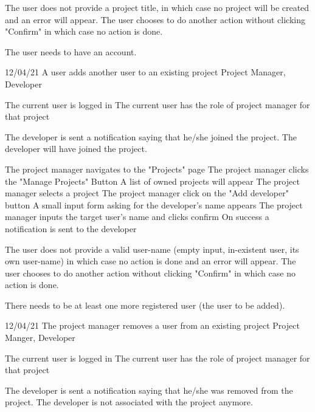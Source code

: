 \documentclass[10pt,a4paper]{article}
\begin{document}
{\begin{itemize}
	\q The user does not provide a project title, in which case no project will be created and an error will appear.
	\q The user chooses to do another action without clicking "Confirm" in which case no action is done.
\end{itemize}}
{\begin{itemize}
	\q The user needs to have an account.
\end{itemize}}%
\newp{}
{12/04/21}
{A user adds another user to an existing project}
{Project Manager, Developer}
{{\begin{itemize}
	\q The current user is logged in
	\q The current user has the role of project manager for that project
\end{itemize}}}
{\begin{itemize}
	\q The developer is sent a notification saying that he/she joined the project.
	\q The developer will have joined the project.
\end{itemize}}
{\begin{itemize}
	\q The project manager navigates to the "Projects" page
	\q The project manager clicks the "Manage Projects" Button
	\q A list of owned projects will appear
	\q The project manager selects a project
	\q The project manager click on the "Add developer" button
	\q A small input form asking for the developer's name appears
	\q The project manager inputs the target user's name and clicks confirm
	\q On success a notification is sent to the developer
\end{itemize}}
{\begin{itemize}
	\q The user does not provide a valid user-name (empty input, in-existent user, its own user-name) in which case no action is done and an error will appear.
	\q The user chooses to do another action without clicking "Confirm" in which case no action is done.
\end{itemize}}
{\begin{itemize}
	\q There needs to be at least one more registered user (the user to be added).
\end{itemize}}
\newp{}
{12/04/21}
{The project manager removes a user from an existing project}
{Project Manger, Developer}
{\begin{itemize}
	\q The current user is logged in
	\q The current user has the role of project manager for that project
\end{itemize}}
{\begin{itemize}
	\q The developer is sent a notification saying that he/she was removed from the project.
	\q The developer is not associated with the project anymore.
\end{itemize}}
\end{document}
